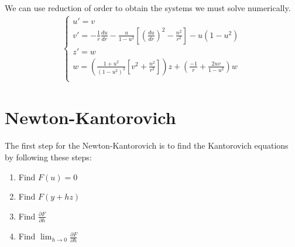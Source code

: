\documentclass{article}
\begin{document}
We can use reduction of order to obtain the systems we must solve numerically. 
\begin{align}
\begin{cases}
u' = v \\
v' = -\frac{1}{r}\frac{du}{dr} - \frac{u}{1-u^2}\left[\left(\frac{du}{dr}\right)^2 - \frac{n^2}{r^2}\right] - u(1-u^2) \\
z' = w \\
w = \left(\frac{1+u^2}{(1-u^2)^2}\left[ v^2 + \frac{n^2}{r^2} \right] \right)z + \left(\frac{-1}{r} + \frac{2uv}{1-u^2}\right)w \\
\end{cases}
\end{align}
\section{Newton-Kantorovich}
The first step for the Newton-Kantorovich is to find the Kantorovich equations by following these steps:
\begin{enumerate}


\item Find $F(u) = 0$
\item Find $F(y + hz)$
\item Find $\frac{\partial F}{\partial h}$
\item Find $\lim_{h\rightarrow 0} \frac{\partial F}{\partial h}$
\end{enumerate}
\end{document}
